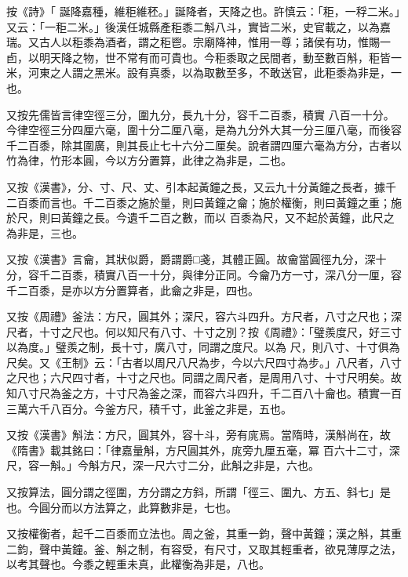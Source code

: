 \begin{pinyinscope}
 按《詩》「
 誕降嘉種，維秬維秠。」誕降者，天降之也。許慎云：「秬，一稃二米。」又云：「一秬二米。」後漢任城縣產秬黍二斛八斗，實皆二米，史官載之，以為嘉瑞。又古人以秬黍為酒者，謂之秬鬯。宗廟降神，惟用一尊；諸侯有功，惟賜一卣，以明天降之物，世不常有而可貴也。今秬黍取之民間者，動至數百斛，秬皆一米，河東之人謂之黑米。設有真黍，以為取數至多，不敢送官，此秬黍為非是，一也。



 又按先儒皆言律空徑三分，圍九分，長九十分，容千二百黍，積實
 八百一十分。今律空徑三分四厘六毫，圍十分二厘八毫，是為九分外大其一分三厘八毫，而後容千二百黍，除其圍廣，則其長止七十六分二厘矣。說者謂四厘六毫為方分，古者以竹為律，竹形本圓，今以方分置算，此律之為非是，二也。



 又按《漢書》，分、寸、尺、丈、引本起黃鐘之長，又云九十分黃鐘之長者，據千二百黍而言也。千二百黍之施於量，則曰黃鐘之龠；施於權衡，則曰黃鐘之重；施於尺，則曰黃鐘之長。今遺千二百之數，而以
 百黍為尺，又不起於黃鐘，此尺之為非是，三也。



 又按《漢書》言龠，其狀似爵，爵謂爵□戔，其體正圓。故龠當圓徑九分，深十分，容千二百黍，積實八百一十分，與律分正同。今龠乃方一寸，深八分一厘，容千二百黍，是亦以方分置算者，此龠之非是，四也。



 又按《周禮》釜法：方尺，圓其外；深尺，容六斗四升。方尺者，八寸之尺也；深尺者，十寸之尺也。何以知尺有八寸、十寸之別？按《周禮》：「璧羨度尺，好三寸以為度。」璧羨之制，長十寸，廣八寸，同謂之度尺。以為
 尺，則八寸、十寸俱為尺矣。又《王制》云：「古者以周尺八尺為步，今以六尺四寸為步。」八尺者，八寸之尺也；六尺四寸者，十寸之尺也。同謂之周尺者，是周用八寸、十寸尺明矣。故知八寸尺為釜之方，十寸尺為釜之深，而容六斗四升，千二百八十龠也。積實一百三萬六千八百分。今釜方尺，積千寸，此釜之非是，五也。



 又按《漢書》斛法：方尺，圓其外，容十斗，旁有庣焉。當隋時，漢斛尚在，故《隋書》載其銘曰：「律嘉量斛，方尺圓其外，庣旁九厘五毫，冪
 百六十二寸，深尺，容一斛。」今斛方尺，深一尺六寸二分，此斛之非是，六也。



 又按算法，圓分謂之徑圍，方分謂之方斜，所謂「徑三、圍九、方五、斜七」是也。今圓分而以方法算之，此算數非是，七也。



 又按權衡者，起千二百黍而立法也。周之釜，其重一鈞，聲中黃鐘；漢之斛，其重二鈞，聲中黃鐘。釜、斛之制，有容受，有尺寸，又取其輕重者，欲見薄厚之法，以考其聲也。今黍之輕重未真，此權衡為非是，八也。




\end{pinyinscope}
